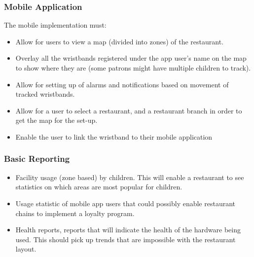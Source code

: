 \documentclass[11pt,titlepage]{article} %
\begin{document}
	\subsubsection{Mobile Application}
The mobile implementation must:
\begin{itemize}
\item Allow for users to view a map (divided into zones) of the restaurant.
\item Overlay all the wristbands registered under the app user’s name on the map to show 
where they are (some patrons might have multiple children to track).
\item Allow  for  setting  up  of  alarms  and  notifications  based  on  movement  of  tracked 
wristbands. 
\item Allow for a user to select a restaurant, and a restaurant branch in order to get the 
map for the set-up. 
\item Enable the user to link the wristband to their mobile application
\end{itemize}


	\subsubsection{Basic Reporting}
	\begin{itemize}
	\item Facility usage  (zone based) by children. This will enable a restaurant to see statistics 
on which areas are most popular for children.
\item Usage statistic of mobile app users that could possibly enable restaurant chains to 
implement a loyalty program.
\item Health reports, reports that will indicate the health of the hardware being used. This should pick up trends that are impossible with the restaurant layout.
\end{itemize}	
\end{document}
